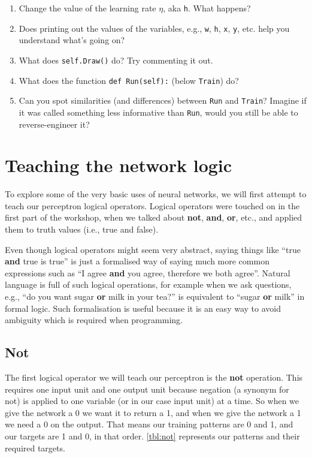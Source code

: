 \documentclass[a4paper,10pt]{article}
\begin{document}
\begin{enumerate}
 \item Change the value of the learning rate $\eta$, aka \texttt{h}. What happens?
 \item Does printing out the values of the variables, e.g., \texttt{w}, \texttt{h}, \texttt{x}, \texttt{y}, etc. help you understand what's going on?
 \item What does \texttt{self.Draw()} do? Try commenting it out.
 \item What does the function \texttt{def Run(self):} (below \texttt{Train}) do?
 \item Can you spot similarities (and differences) between \texttt{Run} and \texttt{Train}? Imagine if it was called something less informative than  \texttt{Run}, would you still be able to reverse-engineer it?
\end{enumerate}




\section{Teaching the network logic}
To explore some of the  very basic uses of neural networks, we will first attempt to teach our perceptron logical operators. Logical operators were touched on in the first part of the workshop, when we talked about \textbf{not}, \textbf{and}, \textbf{or}, etc., and applied them to truth values (i.e., true and false).

Even though logical operators might seem very abstract, saying things like ``true \textbf{and} true is true'' is just a formalised way of saying much more common expressions such as ``I agree \textbf{and} you agree, therefore we both agree''. Natural language is full of such logical operations, for example when we ask questions, e.g., ``do you want sugar \textbf{or} milk in your tea?'' is equivalent to ``sugar \textbf{or} milk'' in formal logic. Such formalisation is useful because it is an easy way to avoid ambiguity which is required when programming.

\subsection{Not}

The first logical operator we will teach our perceptron is the \textbf{not} operation. This requires one input unit and one output unit because negation (a synonym for not) is applied to one variable (or in our case input unit) at a time. So when we give the network a 0 we want it to return a 1, and when we give the network a 1 we need a 0 on the output. That means our training patterns are 0 and 1, and our targets are 1 and 0, in that order. \autoref{tbl:not} represents our patterns and their required targets. 
\end{document}
